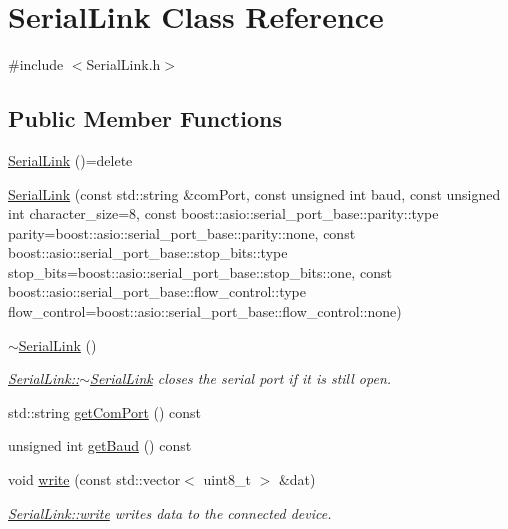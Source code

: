 \hypertarget{class_serial_link}{}\section{Serial\+Link Class Reference}
\label{class_serial_link}


{\ttfamily \#include $<$Serial\+Link.\+h$>$}

\subsection*{Public Member Functions}
\begin{DoxyCompactItemize}
\item 
\hyperlink{class_serial_link_a8789d0d7102d78c83a3c76e2b1a8e1e9}{Serial\+Link} ()=delete
\item 
\hyperlink{class_serial_link_a96aca1c125f24688b57b6fde3fbc4f6d}{Serial\+Link} (const std\+::string \&com\+Port, const unsigned int baud, const unsigned int character\+\_\+size=8, const boost\+::asio\+::serial\+\_\+port\+\_\+base\+::parity\+::type parity=boost\+::asio\+::serial\+\_\+port\+\_\+base\+::parity\+::none, const boost\+::asio\+::serial\+\_\+port\+\_\+base\+::stop\+\_\+bits\+::type stop\+\_\+bits=boost\+::asio\+::serial\+\_\+port\+\_\+base\+::stop\+\_\+bits\+::one, const boost\+::asio\+::serial\+\_\+port\+\_\+base\+::flow\+\_\+control\+::type flow\+\_\+control=boost\+::asio\+::serial\+\_\+port\+\_\+base\+::flow\+\_\+control\+::none)
\item 
\hyperlink{class_serial_link_af9a3c0d7518e7f554f49c198411e1521}{$\sim$\+Serial\+Link} ()
\begin{DoxyCompactList}\small\item\em \hyperlink{class_serial_link_af9a3c0d7518e7f554f49c198411e1521}{Serial\+Link\+::$\sim$\+Serial\+Link} closes the serial port if it is still open. \end{DoxyCompactList}\item 
std\+::string \hyperlink{class_serial_link_a6c6d0211ec68d41c613d92c27da9679a}{get\+Com\+Port} () const 
\item 
unsigned int \hyperlink{class_serial_link_a8611ff8959587b5b629be657f71ac15c}{get\+Baud} () const 
\item 
void \hyperlink{class_serial_link_af0e94df5c46bb1b89f2b79eda8312fde}{write} (const std\+::vector$<$ uint8\+\_\+t $>$ \&dat)
\begin{DoxyCompactList}\small\item\em \hyperlink{class_serial_link_af0e94df5c46bb1b89f2b79eda8312fde}{Serial\+Link\+::write} writes data to the connected device. \end{DoxyCompactList}\item 

\end{DoxyCompactItemize}
